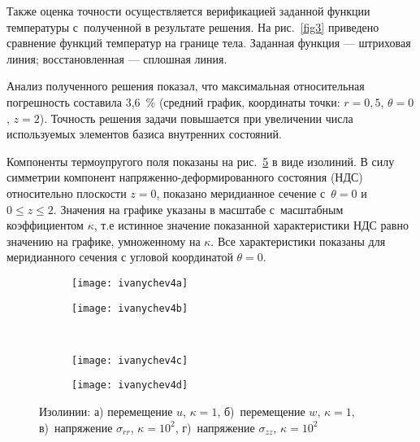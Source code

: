 \documentclass[press]{vestnik}
\begin{document}
Также оценка точности осуществляется верификацией заданной функции 
температуры с~полученной в результате решения. На рис.~\ref{fig3} приведено 
сравнение функций температур на границе тела. Заданная функция --- штриховая 
линия; восстановленная --- сплошная линия.

Анализ полученного решения показал, что максимальная относительная 
погрешность составила 3,6~{\%} (средний график, координаты точки: 
$r=0,5$, $\theta =0$, $z=2$). Точность решения задачи повышается при увеличении 
числа используемых элементов базиса внутренних состояний.

Компоненты термоупругого поля показаны на рис.~\ref{fig4} в виде изолиний. В силу симметрии компонент напряженно-деформированного состояния (НДС) относительно плоскости $z = 0$, показано меридианное сечение с~$\theta =0$ и $0\leqslant z\leqslant 2$. Значения на графике указаны в масштабе с~масштабным коэффициентом $\kappa $, т.е истинное значение показанной характеристики НДС равно значению на графике, умноженному на $\kappa $. Все характеристики показаны 
для меридианного сечения с угловой координатой $\theta =0$.

\begin{figure}[t!]
\centering
\begin{subfigure}{.39\textwidth}
\texttt{[image: ivanychev4a]}
\caption{}
\label{fig4a}
\end{subfigure}
\qquad
\begin{subfigure}{.39\textwidth}
\texttt{[image: ivanychev4b]}
\caption{}
\label{fig4b}
\end{subfigure}\\[4mm]
\begin{subfigure}{.39\textwidth}
\texttt{[image: ivanychev4c]}
\caption{}
\label{fig4c}
\end{subfigure}
\qquad
\begin{subfigure}{.39\textwidth}
\texttt{[image: ivanychev4d]}
\caption{}
\label{fig4d}
\end{subfigure}
\caption{Изолинии: а) перемещение $u$, $\kappa =1$, б)~перемещение $w$, $\kappa 
=1$, в)~напряжение $\sigma_{rr}$, $\kappa =10^{2}$, г)~напряжение $\sigma 
_{zz}$, $\kappa =10^{2}$}
\label{fig4}
\end{figure}
\end{document}
